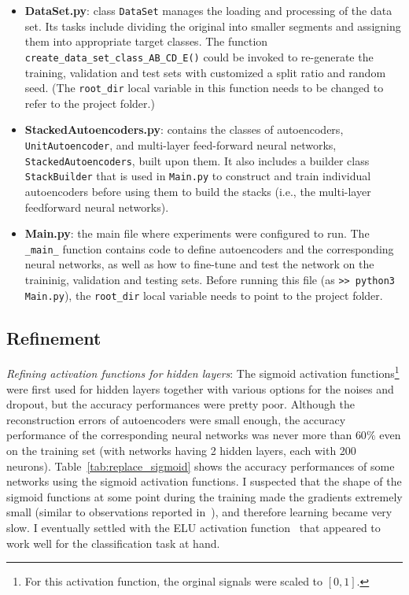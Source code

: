 \documentclass[12pt]{article}
\begin{document}
\begin{itemize}
\item \textbf{DataSet.py}: class \texttt{DataSet} manages the loading and processing of the data set. Its tasks include dividing the original into smaller segments and assigning them into appropriate target classes. The function \texttt{create\_data\_set\_class\_AB\_CD\_E()} could be invoked to re-generate the training, validation and test sets with customized a split ratio and random seed. (The \texttt{root\_dir} local variable in this function needs to be changed to refer to the project folder.)
\item \textbf{StackedAutoencoders.py}: contains the classes of autoencoders, \texttt{UnitAutoencoder}, and multi-layer feed-forward neural networks, \texttt{StackedAutoencoders}, built upon them. It also includes a builder class \texttt{StackBuilder} that is used in \texttt{Main.py} to construct and train individual autoencoders before using them to build the stacks (i.e., the multi-layer feedforward neural networks).
\item \textbf{Main.py}: the main file where experiments were configured to run. The \texttt{\_main\_} function contains code to define autoencoders and the corresponding neural networks, as well as how to fine-tune and test the network on the traininig, validation and testing sets. Before running this file (as \texttt{>> python3 Main.py}), the \texttt{root\_dir} local variable needs to point to the project folder.
\end{itemize}

\subsection{Refinement}

\noindent
\textit{Refining activation functions for hidden layers}: The sigmoid activation functions\footnote{For this activation function, the orginal signals were scaled to $[0,1]$.} were first used for hidden layers together with various options for the noises and dropout, but the accuracy performances were pretty poor. Although the reconstruction errors of autoencoders were small enough, the accuracy performance of the corresponding neural networks was never more than $60\%$ even on the training set (with networks having 2 hidden layers, each with 200 neurons). Table~\ref{tab:replace_sigmoid} shows the accuracy performances of some networks using the sigmoid activation functions. I suspected that the shape of the sigmoid functions at some point during the training made the gradients extremely small (similar to observations reported in~\cite{glorot2010understanding}), and therefore learning became very slow. I eventually settled with the ELU activation function~\cite{clevert2015fast} that appeared to work well for the classification task at hand.
\end{document}
